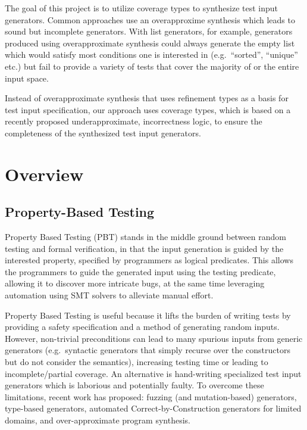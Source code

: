 \documentclass[review, sigplan]{acmart}
\begin{document}
The goal of this project is to utilize coverage types to synthesize test input generators. 
Common approaches use an overapproxime synthesis which leads to sound but incomplete generators. 
With list generators, for example, generators produced using overapproximate synthesis could always generate the empty list which would satisfy most conditions one is interested in (e.g.~``sorted'', ``unique'' etc.) but fail to provide a variety of tests that cover the majority of or the entire input space.

Instead of overapproximate synthesis that uses refinement types as a basis for test input specification, our approach uses coverage types\citep{Poirot}, which is based on a recently proposed underapproximate, incorrectness logic\citep{IL}, to ensure the completeness of the synthesized test input generators.

\section{Overview}

\subsection{Property-Based Testing}

Property Based Testing (PBT) stands in the middle ground between random testing and formal verification, in that the input generation is guided by the interested property, specified by programmers as logical predicates. This allows the programmers to guide the generated input using the testing predicate, allowing it to discover more intricate bugs, at the same time leveraging automation using SMT solvers to alleviate manual effort.

Property Based Testing  is useful because it lifts the burden of writing tests by providing a safety specification and a method of generating random inputs. 
However, non-trivial preconditions can lead to many spurious inputs from generic generators (e.g.~syntactic generators that simply recurse over the constructors but do not consider the semantics), increasing testing time or leading to incomplete/partial coverage. 
An alternative is hand-writing specialized test input generators which is laborious and potentially faulty. 
To overcome these limitations, recent work has proposed: fuzzing (and mutation-based) generators, type-based generators, automated Correct-by-Construction generators for limited domains, and over-approximate program synthesis.
\end{document}
